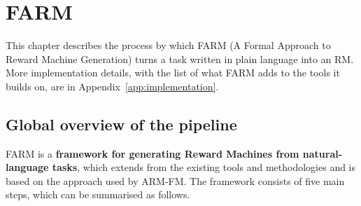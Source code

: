 \documentclass[11pt,english,listoffigures,listoftables]{tfgetsinf}
\begin{document}

\chapter{FARM}
\label{chap:farm}
This chapter describes the process by which FARM (A Formal Approach to Reward Machine Generation) turns a task written in plain language into an RM. More implementation details, with the list of what FARM adds to the tools it builds on, are in Appendix~\ref{app:implementation}.

\section{Global overview of the pipeline}
\label{sec:overview}
FARM is a \textbf{framework for generating Reward Machines from natural-language tasks}, which extends from the existing tools and methodologies and is based on the approach used by ARM-FM. The framework consists of five main steps, which can be summarised as follows.
\end{document}
